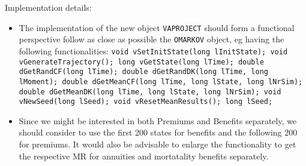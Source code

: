 \documentclass[10pt, a4paper,landscape]{article}
\begin{document}
Implementation details:
\begin{itemize}
\item The implementation of the new object {\tt VAPROJECT} should form a functional perspective follow as close as possible the {\tt OMARKOV} object, eg having the following functionalities: {\tt  void           vSetInitState(long lInitState); 
  void           vGenerateTrajectory();
  long           vGetState(long lTime);
  double         dGetRandCF(long lTime);
  double         dGetRandDK(long lTime, long lMoment);
  double         dGetMeanCF(long lTime, long lState, long lNrSim);
  double         dGetMeanDK(long lTime, long lState, long lNrSim);
  void           vNewSeed(long lSeed);
  void           vResetMeanResults();
  long           lSeed;}
\item Since we might be interested in both Premiums and Benefits separately, we should consider to use the first 200 states for benefits and the following 200 for premiums. It would also be advisable to enlarge the functionality to get the respective MR for annuities and mortatality benefits separately.
\end{itemize}
\end{document}
